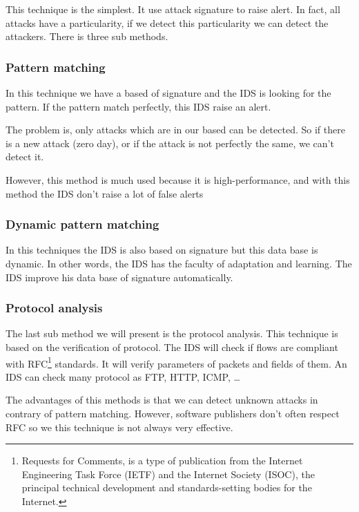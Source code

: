 This technique is the simplest. It use attack signature to raise alert. In fact, all attacks have a particularity,
if we detect this particularity we can detect the attackers. There is three sub methods.

\subsubsection{Pattern matching}

In this technique we have a based of signature and the IDS is looking for the pattern. If the pattern match
perfectly, this IDS raise an alert.

The problem is, only attacks which are in our based can be detected. So if there is a new attack (zero day), or if
the attack is not perfectly the same, we can't detect it.

However, this method is much used because it is high-performance, and with this method the IDS don't raise a lot of
false alerts

\subsubsection{Dynamic pattern matching}

In this techniques the IDS is also based on signature but this data base is dynamic. In other words, the IDS has
the faculty of adaptation and learning. The IDS improve his data base of signature automatically.

\subsubsection{Protocol analysis}

The last sub method we will present is the protocol analysis. This technique is based on the verification of
protocol. The IDS will check if flows are compliant with RFC\footnote{Requests for Comments, is a type of
  publication from the Internet Engineering Task Force (IETF) and the Internet Society (ISOC), the principal
  technical development and standards-setting bodies for the Internet.} standards. It will verify parameters of
packets and fields of them. An IDS can check many protocol as FTP, HTTP, ICMP, \dots

The advantages of this methods is that we can detect unknown attacks in contrary of pattern matching. However,
software publishers don't often respect RFC so we this technique is not always very effective.





